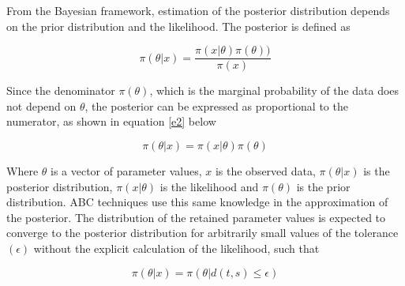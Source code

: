 From the Bayesian framework, estimation of the posterior distribution depends on the prior distribution and the likelihood. The posterior is defined as

\begin{equation}
\pi (\theta|x) = \frac{\pi (x|\theta) \pi (\theta))}{\pi (x)}
\label{e1}
\end{equation}


Since the denominator $\pi (\theta)$, which is the marginal probability of the data does not depend on $\theta$, the posterior can be expressed as proportional to the numerator, as shown in equation \ref{e2} below

\begin{equation}
\pi (\theta|x) = \pi (x|\theta) \pi (\theta)
\label{e2}
\end{equation}

Where $\theta$ is a vector of parameter values, $x$ is the observed data, $\pi (\theta|x)$ is the posterior distribution, $\pi (x|\theta)$ is the likelihood and $\pi (\theta)$ is the prior distribution. ABC techniques use this same knowledge in the approximation of the posterior. The distribution of the retained parameter values is expected to converge to the posterior distribution for arbitrarily small values of  the tolerance $(\epsilon)$ without the explicit calculation of the likelihood, such that

\begin{equation}
\pi (\theta|x) = \pi (\theta| d(t,s) \leq \epsilon)
\label{e3}
\end{equation}


